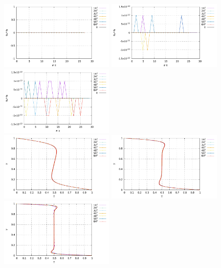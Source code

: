 \begin{center}
\includegraphics[width=5.7cm]{python_codes/fieldstone_110/results_BA/q_Ra1e4.pdf}
\includegraphics[width=5.7cm]{python_codes/fieldstone_110/results_BA/q_Ra1e5.pdf}
\includegraphics[width=5.7cm]{python_codes/fieldstone_110/results_BA/q_Ra1e6.pdf}\\
\includegraphics[width=5.7cm]{python_codes/fieldstone_110/results_BA/T_profile_Ra1e4.pdf}
\includegraphics[width=5.7cm]{python_codes/fieldstone_110/results_BA/T_profile_Ra1e5.pdf}
\includegraphics[width=5.7cm]{python_codes/fieldstone_110/results_BA/T_profile_Ra1e6.pdf}\\

\end{center}
